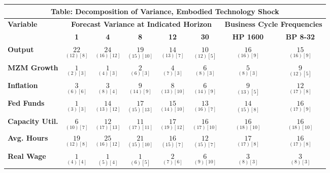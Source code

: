 \documentclass{article}
\begin{document}
 
 \begin{tabular}{|l|c|@{}c|c|@{}c|c|@{}c|c|} 
 \hline 
 \multicolumn{8}{|c|}{\textbf{Table: Decomposition of Variance, Embodied Technology Shock}} \\ \hline 
 \textbf{Variable} & \multicolumn{5}{|c}{\textbf{Forecast Variance at 
 Indicated Horizon}} & \multicolumn{2}{|c|}{\textbf{Business Cycle 
 Frequencies}} \\ \cline{2-8} 
 & \textbf{1} & \textbf{4} & \textbf{8} & \textbf{12} & \textbf{30} & \textbf{%
 HP 1600} & \textbf{BP 8-32} \\ \hline\hline 
 \textbf{Output} & $\underset{( 12) [  8]}{ 22}$ & $\underset{( 16) [ 12]}{ 24}$ & $\underset{( 15) [ 10]}{ 19}$ & $\underset{( 13) [  7]}{ 14}$ & $\underset{( 12) [  5]}{ 10}$ & $\underset{( 16) [  9]}{ 16}$ & $\underset{( 16) [  9]}{ 15}$ \\ \hline 
 \textbf{MZM Growth} & $\underset{(  2) [  3]}{  1}$ & $\underset{(  4) [  3]}{  1}$ & $\underset{(  6) [  3]}{  2}$ & $\underset{(  7) [  3]}{  4}$ & $\underset{(  8) [  3]}{  6}$ & $\underset{(  8) [  3]}{  5}$ & $\underset{( 12) [  5]}{  9}$ \\ \hline 
 \textbf{Inflation} & $\underset{(  6) [  6]}{  3}$ & $\underset{(  8) [  4]}{  3}$ & $\underset{( 14) [  9]}{  9}$ & $\underset{( 13) [ 10]}{  8}$ & $\underset{( 14) [  9]}{  6}$ & $\underset{( 13) [  5]}{  9}$ & $\underset{( 17) [  8]}{ 12}$ \\ \hline 
 \textbf{Fed Funds} & $\underset{(  3) [  3]}{  1}$ & $\underset{( 13) [ 12]}{ 14}$ & $\underset{( 15) [ 13]}{ 17}$ & $\underset{( 14) [ 10]}{ 15}$ & $\underset{( 16) [  7]}{ 13}$ & $\underset{( 15) [  8]}{ 14}$ & $\underset{( 17) [  9]}{ 16}$ \\ \hline 
 \textbf{Capacity Util.} & $\underset{( 10) [  7]}{  6}$ & $\underset{( 17) [ 13]}{ 12}$ & $\underset{( 17) [ 11]}{ 11}$ & $\underset{( 19) [ 12]}{ 17}$ & $\underset{( 17) [ 10]}{ 16}$ & $\underset{( 18) [ 10]}{ 16}$ & $\underset{( 18) [ 10]}{ 16}$ \\ \hline 
 \textbf{Avg. Hours} & $\underset{( 12) [  8]}{ 19}$ & $\underset{( 16) [ 12]}{ 25}$ & $\underset{( 15) [ 10]}{ 21}$ & $\underset{( 15) [  7]}{ 16}$ & $\underset{( 15) [  7]}{ 12}$ & $\underset{( 17) [  8]}{ 17}$ & $\underset{( 17) [  8]}{ 16}$ \\ \hline 
 \textbf{Real Wage} &  $\underset{(  4) [  4]}{  1}$ & $\underset{(  5) [  4]}{  1}$ & $\underset{(  6) [  5]}{  1}$ & $\underset{(  7) [  6]}{  2}$ & $\underset{(  9) [ 10]}{  6}$ & $\underset{(  8) [  3]}{  3}$ & $\underset{(  8) [  3]}{  3}$ \\ \hline 

\end{tabular}
\end{document}
